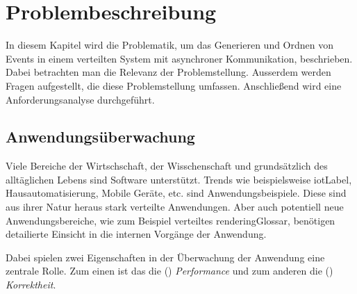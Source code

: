%

\chapter{Problembeschreibung}
\label{chapter:Problembeschreibung}
In diesem Kapitel wird die Problematik, um das Generieren und Ordnen von Events in einem verteilten System mit asynchroner Kommunikation, beschrieben. Dabei betrachten man die Relevanz der Problemstellung. Ausserdem werden Fragen aufgestellt, die diese Problemstellung umfassen. Anschließend wird eine Anforderungsanalyse durchgeführt.

\section{Anwendungsüberwachung}
\label{section:Tracing von Anwendungen}
Viele Bereiche der Wirtschschaft, der Wisschenschaft und grundsätzlich des alltäglichen Lebens sind Software unterstützt. Trends wie beispielsweise \gls{iotLabel}, Hausautomatisierung, Mobile Geräte, etc. sind Anwendungsbeispiele. Diese sind aus ihrer Natur heraus stark verteilte Anwendungen. Aber auch potentiell neue Anwendungsbereiche, wie zum Beispiel verteiltes \gls{renderingGlossar}, benötigen detailierte Einsicht in die internen Vorgänge der Anwendung. 

Dabei spielen zwei Eigenschaften in der Überwachung der Anwendung eine zentrale Rolle. 
Zum einen ist das die () \emph{Performance} und zum anderen die () \emph{Korrektheit}.


